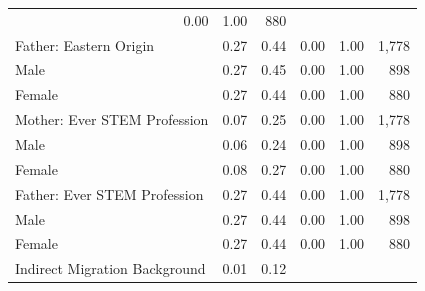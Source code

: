 \documentclass[a4paper, oneside, hyperfootnotes = false]{article}
\begin{document}
{\begin{table}[ht]
\begin{center}
{\begin{tabular}{llllll}
			\multicolumn{1}{r}{0.00} &
			\multicolumn{1}{r}{1.00} &
			\multicolumn{1}{r}{880} \\
			\multicolumn{1}{l}{Father: Eastern Origin} &
			\multicolumn{1}{r}{0.27} &
			\multicolumn{1}{r}{0.44} &
			\multicolumn{1}{r}{0.00} &
			\multicolumn{1}{r}{1.00} &
			\multicolumn{1}{r}{1,778} \\
			\multicolumn{1}{l}{\hspace{1em}Male} &
			\multicolumn{1}{r}{0.27} &
			\multicolumn{1}{r}{0.45} &
			\multicolumn{1}{r}{0.00} &
			\multicolumn{1}{r}{1.00} &
			\multicolumn{1}{r}{898} \\
			\multicolumn{1}{l}{\hspace{1em}Female} &
			\multicolumn{1}{r}{0.27} &
			\multicolumn{1}{r}{0.44} &
			\multicolumn{1}{r}{0.00} &
			\multicolumn{1}{r}{1.00} &
			\multicolumn{1}{r}{880} \\
			\multicolumn{1}{l}{Mother: Ever STEM Profession} &
			\multicolumn{1}{r}{0.07} &
			\multicolumn{1}{r}{0.25} &
			\multicolumn{1}{r}{0.00} &
			\multicolumn{1}{r}{1.00} &
			\multicolumn{1}{r}{1,778} \\
			\multicolumn{1}{l}{\hspace{1em}Male} &
			\multicolumn{1}{r}{0.06} &
			\multicolumn{1}{r}{0.24} &
			\multicolumn{1}{r}{0.00} &
			\multicolumn{1}{r}{1.00} &
			\multicolumn{1}{r}{898} \\
			\multicolumn{1}{l}{\hspace{1em}Female} &
			\multicolumn{1}{r}{0.08} &
			\multicolumn{1}{r}{0.27} &
			\multicolumn{1}{r}{0.00} &
			\multicolumn{1}{r}{1.00} &
			\multicolumn{1}{r}{880} \\
			\multicolumn{1}{l}{Father: Ever STEM Profession} &
			\multicolumn{1}{r}{0.27} &
			\multicolumn{1}{r}{0.44} &
			\multicolumn{1}{r}{0.00} &
			\multicolumn{1}{r}{1.00} &
			\multicolumn{1}{r}{1,778} \\
			\multicolumn{1}{l}{\hspace{1em}Male} &
			\multicolumn{1}{r}{0.27} &
			\multicolumn{1}{r}{0.44} &
			\multicolumn{1}{r}{0.00} &
			\multicolumn{1}{r}{1.00} &
			\multicolumn{1}{r}{898} \\
			\multicolumn{1}{l}{\hspace{1em}Female} &
			\multicolumn{1}{r}{0.27} &
			\multicolumn{1}{r}{0.44} &
			\multicolumn{1}{r}{0.00} &
			\multicolumn{1}{r}{1.00} &
			\multicolumn{1}{r}{880} \\
			\multicolumn{1}{l}{Indirect Migration Background} &
			\multicolumn{1}{r}{0.01} &
			\multicolumn{1}{r}{0.12} &

\end{tabular}}
\end{center}
\end{table}}
\end{document}
